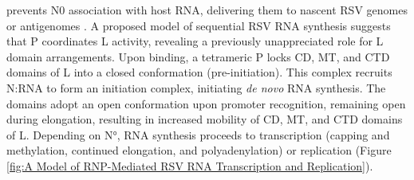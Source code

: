 prevents N0 association with host RNA, delivering them to nascent RSV genomes or antigenomes \cite{Castagne2004BiochemicalDomain, Galloux2015IdentificationNucleoprotein}. A proposed model of sequential RSV RNA synthesis suggests that P coordinates L activity, revealing a previously unappreciated role for L domain arrangements. Upon binding, a tetrameric P locks CD, MT, and CTD domains of L into a closed conformation (pre-initiation). This complex recruits N:RNA to form an initiation complex, initiating \textit{de novo} RNA synthesis. The domains adopt an open conformation upon promoter recognition, remaining open during elongation, resulting in increased mobility of CD, MT, and CTD domains of L. Depending on N°, RNA synthesis proceeds to transcription (capping and methylation, continued elongation, and polyadenylation) or replication \cite{Cao2020Cryo-EMPolymerase} (Figure \ref{fig:A Model of RNP-Mediated RSV RNA Transcription and Replication}).

